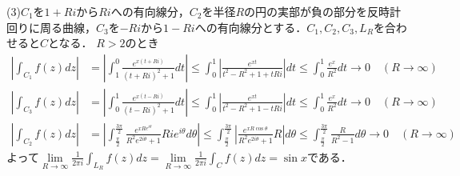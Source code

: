 \documentclass[
		book,
		head_space=20mm,
		foot_space=20mm,
		gutter=10mm,
		line_length=190mm
]{jlreq}
\begin{document}
(3)$C_1$を$1+Ri$から$Ri$への有向線分，$C_2$を半径$R$の円の実部が負の部分を反時計回りに周る曲線，$C_3$を$-Ri$から$1-Ri$への有向線分とする．$C_1,C_2,C_3,L_R$を合わせると$C$となる．
$R>2$のとき
\begin{align}
	\left| \int_{C_1}f(z)dz \right|&=\left| \int_1^0 \frac{e^{x(t+Ri)}}{(t+Ri)^2+1}dt \right|\le \int_0^1 \left| \frac{e^{xt}}{t^2-R^2+1+tRi} \right|dt\le \int_0^1 \frac{e^x}{R^2}dt\rightarrow 0\quad(R\rightarrow \infty)\\
	\left| \int_{C_3}f(z)dz \right|&=\left| \int_0^1 \frac{e^{x(t-Ri)}}{(t-Ri)^2+1}dt \right|\le \int_0^1 \left| \frac{e^{xt}}{t^2-R^2+1-tRi} \right|dt\le \int_0^1 \frac{e^x}{R^2}dt\rightarrow 0\quad(R\rightarrow \infty)\\
	\left| \int_{C_2}f(z)dz \right|&=\left| \int_{\frac{\pi}{2}}^{\frac{3\pi}{2}} \frac{e^{xRe^{i\theta}}}{R^2e^{2i\theta}+1}Rie^{i\theta}d\theta \right|\le \int_{\frac{\pi}{2}}^{\frac{3\pi}{2}} \left| \frac{e^{xR\cos\theta}}{R^2e^{2i\theta}+1}R\right|d\theta\le \int_{\frac{\pi}{2}}^{\frac{3\pi}{2}} \frac{R}{R^2-1}d\theta\rightarrow 0\quad(R\rightarrow \infty)
\end{align}
よって$\lim\limits_{R\rightarrow \infty}\frac{1}{2\pi i}\int_{L_R}f(z)dz=\lim\limits_{R\rightarrow \infty}\frac{1}{2\pi i}\int_Cf(z)dz=\sin x$である．
\end{document}
